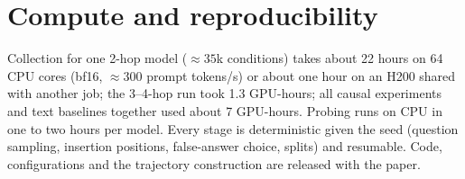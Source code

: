 \section{Compute and reproducibility}
\label{app:compute}
Collection for one 2-hop model ($\approx35$k conditions) takes about 22 hours on 64 CPU cores (bf16, $\approx300$ prompt tokens/s) or about one hour on an H200 shared with another job; the 3--4-hop run took 1.3 GPU-hours; all causal experiments and text baselines together used about 7 GPU-hours. Probing runs on CPU in one to two hours per model. Every stage is deterministic given the seed (question sampling, insertion positions, false-answer choice, splits) and resumable. Code, configurations and the trajectory construction are released with the paper.
